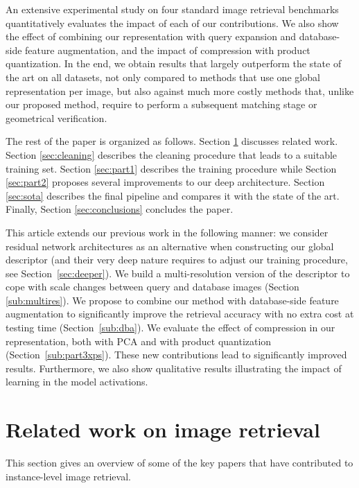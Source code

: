 \documentclass[twocolumn]{svjour3}          \smartqed  \usepackage{graphicx}
\begin{document}
An extensive experimental study on four standard image retrieval benchmarks quantitatively evaluates the impact of each of our contributions. 
We also show the effect of combining our representation with query expansion and database-side feature augmentation, and the impact of compression with product quantization.
In the end, we obtain results that largely outperform the state of the art on all datasets, not only compared to methods that use one global representation per image, but also against much more costly methods that, unlike our proposed method, require to perform a subsequent matching stage or geometrical verification.

The rest of the paper is organized as follows. Section \ref{sec:rw} discusses related work. Section \ref{sec:cleaning} describes the cleaning procedure that leads to a suitable training set. Section \ref{sec:part1} describes the training procedure while Section \ref{sec:part2} proposes several improvements to our deep architecture. Section \ref{sec:sota} describes the final pipeline and compares it with the state of the art. Finally, Section \ref{sec:conclusions} concludes the paper.

This article extends our previous work \citep{gordo2016deep} in the following manner: we consider residual network architectures as an alternative when constructing our global descriptor (and their very deep nature requires to adjust our training procedure, see Section~\ref{sec:deeper}).
 We build a multi-resolution version of the descriptor to cope with scale changes between query and database images (Section \ref{sub:multires}).
 We propose to combine our method with database-side feature augmentation to significantly improve the retrieval accuracy with no extra cost at testing time (Section~\ref{sub:dba}). 
We evaluate the effect of compression in our representation, both with PCA and with product quantization (Section~\ref{sub:part3xps}).
These new contributions lead to significantly improved results.
Furthermore, we also show qualitative results illustrating the impact of learning in the model activations. 

\section{Related work on image retrieval}
\label{sec:rw}

This section gives an overview of some of the key papers that have contributed to instance-level image retrieval.
\end{document}
